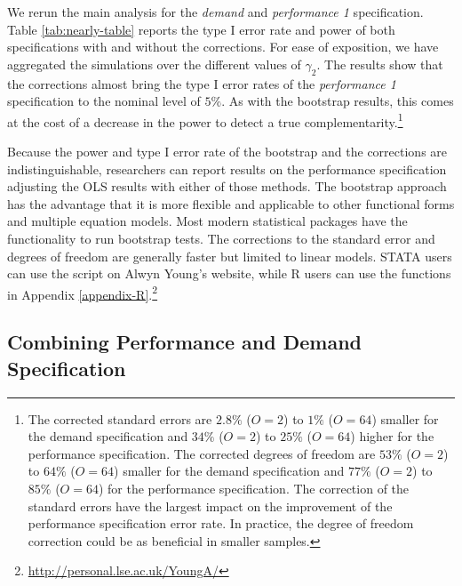 \documentclass[12pt]{article}
\begin{document}
We rerun the main analysis for the \emph{demand} and \emph{performance 1} specification. Table \ref{tab:nearly-table} reports the type I error rate and power of both specifications with and without the corrections. For ease of exposition, we have aggregated the simulations over the different values of $\gamma_2$. The results show that the corrections almost bring the type I error rates of the \emph{performance 1} specification to the nominal level of $5\%$. As with the bootstrap results, this comes at the cost of a decrease in the power to detect a true complementarity.\footnote{The corrected standard errors are $2.8\%$ ($O = 2$) to $1\%$ ($O = 64$) smaller for the demand specification and $34\%$ ($O = 2$) to $25\%$ ($O = 64$) higher for the performance specification. The corrected degrees of freedom are $53\%$ ($O = 2$) to $64\%$ ($O = 64$) smaller for the demand specification and $77\%$ ($O = 2$) to $85\%$ ($O = 64$) for the performance specification. The correction of the standard errors have the largest impact on the improvement of the performance specification error rate. In practice, the degree of freedom correction could be as beneficial in smaller samples.}



Because the power and type I error rate of the bootstrap and the \citet{young_improved_2016} corrections are indistinguishable, researchers can report results on the performance specification adjusting the OLS results with either of those methods. The bootstrap approach has the advantage that it is more flexible and applicable to other functional forms and multiple equation models. Most modern statistical packages have the functionality to run bootstrap tests. The corrections to the standard error and degrees of freedom are generally faster but limited to linear models. STATA users can use the script on Alwyn Young's website, while R users can use the functions in Appendix \ref{appendix-R}.\footnote{\url{http://personal.lse.ac.uk/YoungA/}}

\subsection{Combining Performance and Demand Specification}
\end{document}
